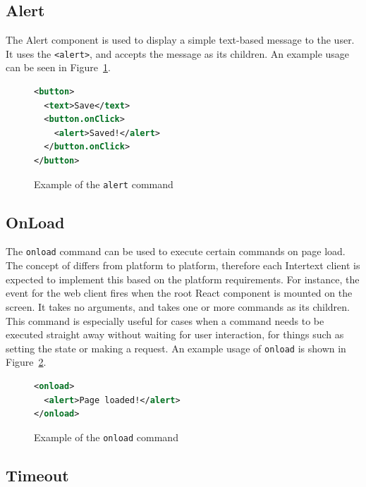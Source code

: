 \subsection{Alert}

The Alert component is used to display a simple text-based message to the user. It uses the \texttt{<alert>}, and accepts the message as its children. An example usage can be seen in Figure~\ref{fig:alert_command_usage}.

\begin{figure}[htb]
\begin{minipage}{\linewidth}
\begin{lstlisting}[language=xml]
<button>
  <text>Save</text>
  <button.onClick>
    <alert>Saved!</alert>
  </button.onClick>
</button>
\end{lstlisting}
\end{minipage}
\caption{Example of the \texttt{alert} command}%
\label{fig:alert_command_usage}%
\end{figure}

\subsection{OnLoad}

The \texttt{onload} command can be used to execute certain commands on page load. The concept of  differs from platform to platform, therefore each Intertext client is expected to implement this based on the platform requirements. For instance, the  event for the web client fires when the root React component is mounted on the screen. It takes no arguments, and takes one or more commands as its children. This command is especially useful for cases when a command needs to be executed straight away without waiting for user interaction, for things such as setting the state or making a request. An example usage of \texttt{onload} is shown in Figure~\ref{fig:onload_usage}.

\begin{figure}[htb]
\begin{minipage}{\linewidth}
\begin{lstlisting}[language=xml]
<onload>
  <alert>Page loaded!</alert>
</onload>
\end{lstlisting}
\end{minipage}
\caption{Example of the \texttt{onload} command}%
\label{fig:onload_usage}%
\end{figure}

\subsection{Timeout}

